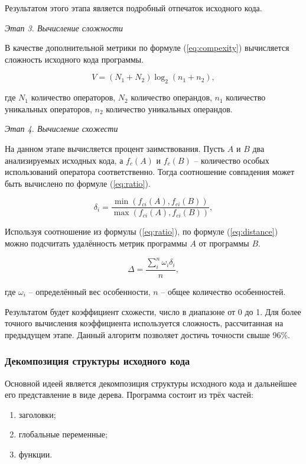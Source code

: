 Результатом этого этапа является подробный отпечаток исходного кода.

\noindent\textit{Этап 3. Вычисление сложности}

В качестве дополнительной метрики по формуле (\ref{eq:compexity}) вычисляется сложность исходного кода программы\cite{algorithm-structure}.

\begin{equation}
	\label{eq:compexity}
	V = (N_1+N_2)\log_2(n_1+n_2),
\end{equation}

где $N_1$ количество операторов, $N_2$ количество операндов, $n_1$ количество уникальных операторов, $n_2$ количество уникальных операндов.

\noindent\textit{Этап 4. Вычисление схожести}

На данном этапе вычисляется процент заимствования. Пусть $A$ и $B$ два анализируемых исходных кода, а $f_c(A)$ и $f_c(B)$ -- количество особых использований оператора соответственно. Тогда соотношение совпадения может быть вычислено по формуле (\ref{eq:ratio}).

\begin{equation}
	\label{eq:ratio}
	\delta_i=\frac{\min(f_{ci}(A), f_{ci}(B))}{\max(f_{ci}(A), f_{ci}(B))},
\end{equation}

Используя соотношение из формулы (\ref{eq:ratio}), по формуле (\ref{eq:distance}) можно подсчитать удалённость метрик программы $A$ от программы $B$.

\begin{equation}
	\label{eq:distance}
	\varDelta=\frac{\sum\limits^n_{i}\omega_i\delta_i}{n},
\end{equation}

где $\omega_i$ -- определённый вес особенности, $n$ -- общее количество особенностей.

Результатом будет коэффициент схожести, число в диапазоне от 0 до 1. Для более точного вычисления коэффициента используется сложность, рассчитанная на предыдущем этапе. Данный алгоритм позволяет достичь точности свыше 96\%.

\subsubsection{Декомпозиция структуры исходного кода}

Основной идеей является декомпозиция структуры исходного кода и дальнейшее его представление в виде дерева\cite{antiplagiat-xml}. Программа состоит из трёх частей:
\begin{enumerate}
	\item заголовки;
	\item глобальные переменные;
	\item функции.
\end{enumerate}

